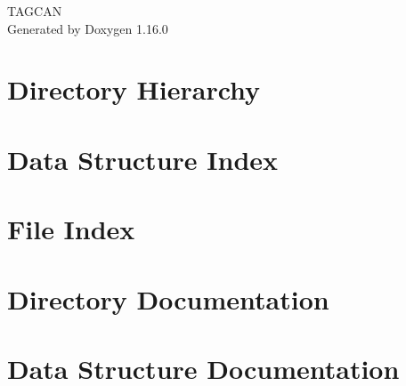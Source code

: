 \documentclass[twoside]{book}
\newcommand{\+}{\discretionary{\mbox{\scriptsize$\hookleftarrow$}}{}{}}
\newcommand{\clearemptydoublepage}{%
    \newpage{\pagestyle{empty}\cleardoublepage}%
  }
\begin{document}
  \raggedbottom
    \hypersetup{pageanchor=false,
                bookmarksnumbered=true,
                pdfencoding=unicode
               }
  \begin{titlepage}
  \vspace*{7cm}
  \begin{center}%
  {\Large TAGCAN}\\
  \vspace*{1cm}
  {\large Generated by Doxygen 1.16.0}\\
  \end{center}
  \end{titlepage}
  \clearemptydoublepage
  \tableofcontents
  \clearemptydoublepage
  \hypersetup{pageanchor=true}



\chapter{Directory Hierarchy}

\chapter{Data Structure Index}

\chapter{File Index}

\chapter{Directory Documentation}







\chapter{Data Structure Documentation}


\end{document}
